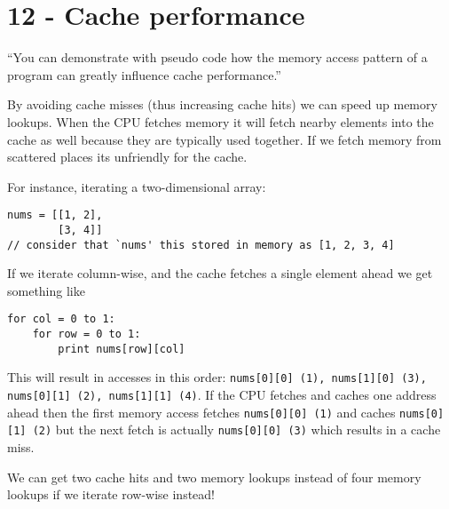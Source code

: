 \section{12 - Cache performance}
``You can demonstrate with pseudo code how the memory access pattern of a program can greatly influence cache performance.''

By avoiding cache misses (thus increasing cache hits) we can speed up memory lookups. When the CPU fetches memory it will fetch nearby elements into the cache as well because they are typically used together. If we fetch memory from scattered places its unfriendly for the cache.

For instance, iterating a two-dimensional array:

\begin{lstlisting}
nums = [[1, 2],
        [3, 4]]
// consider that `nums' this stored in memory as [1, 2, 3, 4]
\end{lstlisting}

If we iterate column-wise, and the cache fetches a single element ahead we get something like

\begin{lstlisting}
for col = 0 to 1:
    for row = 0 to 1:
        print nums[row][col]
\end{lstlisting}

This will result in accesses in this order: \texttt{nums[0][0] (1), nums[1][0] (3), nums[0][1] (2), nums[1][1] (4)}. If the CPU fetches and caches one address ahead then the first memory access fetches \texttt{nums[0][0] (1)} and caches \texttt{nums[0][1] (2)} but the next fetch is actually \texttt{nums[0][0] (3)} which results in a cache miss.

We can get two cache hits and two memory lookups instead of four memory lookups if we iterate row-wise instead!

